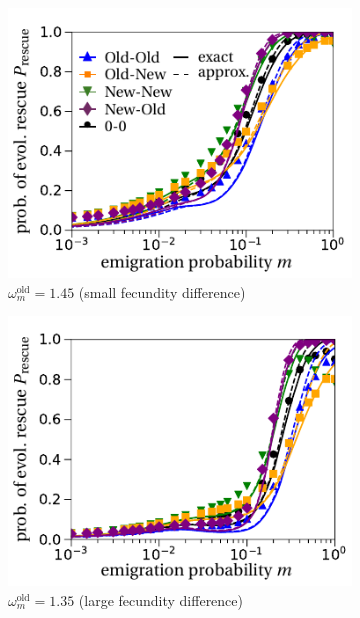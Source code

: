 \documentclass[a4paper,11pt]{article}
\begin{document}
\begin{figure}[t!]
	\centering
	\begin{subfigure}{.5\textwidth}
  		\centering
  		\includegraphics[width=\linewidth]{fig5a.pdf}
  		\caption{$\omega^\text{old}_m=1.45$ (small fecundity difference)}
	\end{subfigure}%
	\begin{subfigure}{.5\textwidth}
  		\centering
  		\includegraphics[width=\linewidth]{fig5b.pdf}
  		\caption{$\omega^\text{old}_m=1.35$ (large fecundity difference)}
	\end{subfigure}
	\begin{subfigure}{.5\textwidth}

\end{subfigure}
\end{figure}
\end{document}
